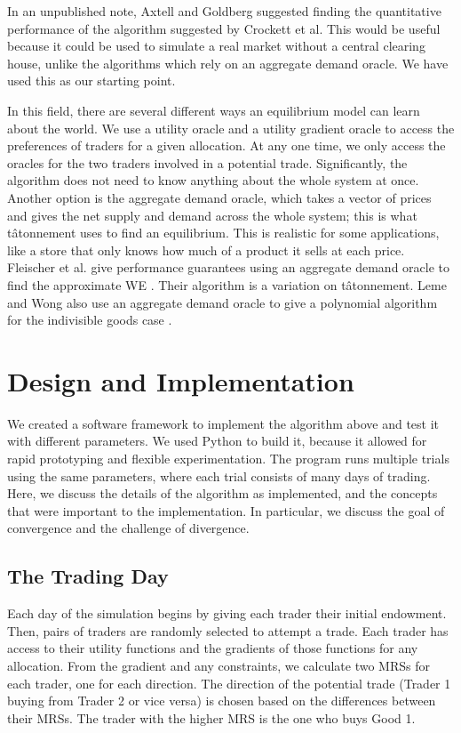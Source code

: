 \documentclass[12pt,a4paper,titlepage]{article}
\begin{document}
In an unpublished note, Axtell and Goldberg \cite{goldberg} suggested finding the quantitative performance of the algorithm suggested by Crockett et al.
This would be useful because it could be used to simulate a real market without a central clearing house, unlike the algorithms which rely on an aggregate demand oracle.
We have used this as our starting point.


In this field, there are several different ways an equilibrium model can learn about the world. 
We use a utility oracle and a utility gradient oracle to access the preferences of traders for a given allocation.
At any one time, we only access the oracles for the two traders involved in a potential trade.
Significantly, the algorithm does not need to know anything about the whole system at once.
Another option is the aggregate demand oracle, which takes a vector of prices and gives the net supply and demand across the whole system; this is what tâtonnement uses to find an equilibrium.
This is realistic for some applications, like a store that only knows how much of a product it sells at each price.
Fleischer et al. give performance guarantees using an aggregate demand oracle to find the approximate WE \cite{fleischer}.
Their algorithm is a variation on tâtonnement.
Leme and Wong also use an aggregate demand oracle to give a polynomial algorithm for the indivisible goods case \cite{leme}.

\section{Design and Implementation}\label{desimp}
We created a software framework to implement the algorithm above and test it with different parameters.
We used Python to build it, because it allowed for rapid prototyping and flexible experimentation.
The program runs multiple trials using the same parameters, where each trial consists of many days of trading.
Here, we discuss the details of the algorithm as implemented, and the concepts that were important to the implementation.
In particular, we discuss the goal of convergence and the challenge of divergence.

\subsection{The Trading Day}

Each day of the simulation begins by giving each trader their initial endowment.
Then, pairs of traders are randomly selected to attempt a trade.
Each trader has access to their utility functions and the gradients of those functions for any allocation.
From the gradient and any constraints, we calculate two MRSs for each trader, one for each direction.
The direction of the potential trade (Trader 1 buying from Trader 2 or vice versa) is chosen based on the differences between their MRSs.
The trader with the higher MRS is the one who buys Good 1.
\end{document}
